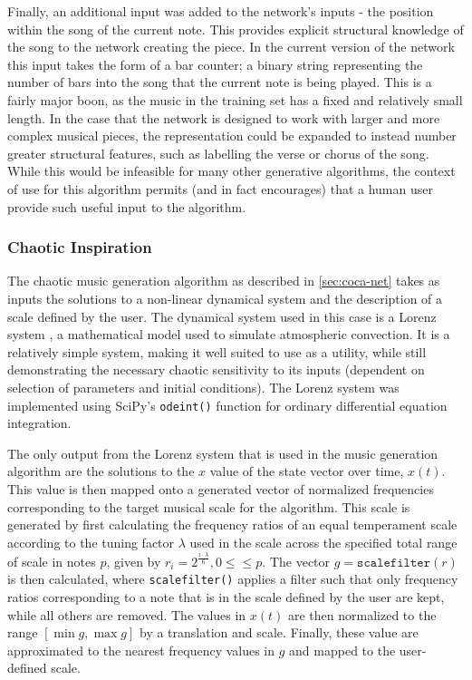 \documentclass[ author={Stephen Livermore-Tozer},
				supervisor={Dr. Peter Flach},
				degree={MEng},
				title={Algorithmic Co-composition Using Machine Learning},
				subtitle={},
				type={research},
				year={2016} ]{dissertation}
\begin{document}
	Finally, an additional input was added to the network's inputs - the position within the song of the current note. This provides explicit structural knowledge of the song to the network creating the piece. In the current version of the network this input takes the form of a bar counter; a binary string representing the number of bars into the song that the current note is being played. This is a fairly major boon, as the music in the training set has a fixed and relatively small length. In the case that the network is designed to work with larger and more complex musical pieces, the representation could be expanded to instead number greater structural features, such as labelling the verse or chorus of the song. While this would be infeasible for many other generative algorithms, the context of use for this algorithm permits (and in fact encourages) that a human user provide such useful input to the algorithm.

	\subsubsection{Chaotic Inspiration}
	
	The chaotic music generation algorithm as described in \ref{sec:coca-net} takes as inputs the solutions to a non-linear dynamical system and the description of a scale defined by the user. The dynamical system used in this case is a Lorenz system \cite{lorenz1963deterministic}, a mathematical model used to simulate atmospheric convection. It is a relatively simple system, making it well suited to use as a utility, while still demonstrating the necessary chaotic sensitivity to its inputs (dependent on selection of parameters and initial conditions). The Lorenz system was implemented using SciPy's \texttt{odeint()} function for ordinary differential equation integration.
	
	The only output from the Lorenz system that is used in the music generation algorithm are the solutions to the $x$ value of the state vector over time, $x(t)$. This value is then mapped onto a generated vector of normalized frequencies corresponding to the target musical scale for the algorithm. This scale is generated by first calculating the frequency ratios of an equal temperament scale according to the tuning factor $\lambda$ used in the scale across the specified total range of scale in notes $p$, given by $r_i = 2^{\frac{i \cdot \lambda}{6}}, 0 \leq\leq p$. The vector $g = \mathtt{scalefilter}(r)$ is then calculated, where \texttt{scalefilter()} applies a filter such that only frequency ratios corresponding to a note that is in the scale defined by the user are kept, while all others are removed. The values in $x(t)$ are then normalized to the range $[\min g, \max g]$ by a translation and scale. Finally, these value are approximated to the nearest frequency values in $g$ and mapped to the user-defined scale.
	
\end{document}
